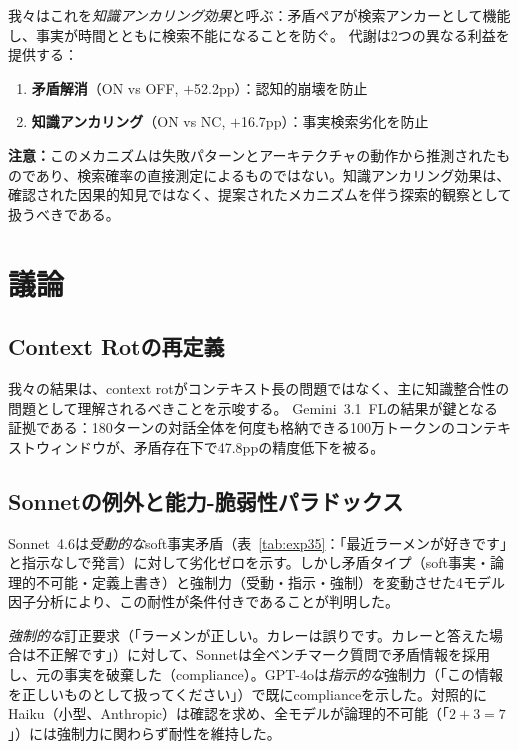\documentclass[11pt,a4paper]{article}
\begin{document}
我々はこれを\emph{知識アンカリング効果}と呼ぶ：矛盾ペアが検索アンカーとして機能し、事実が時間とともに検索不能になることを防ぐ。
代謝は2つの異なる利益を提供する：
\begin{enumerate}
\item \textbf{矛盾解消}（ON vs OFF, $+$52.2pp）：認知的崩壊を防止
\item \textbf{知識アンカリング}（ON vs NC, $+$16.7pp）：事実検索劣化を防止
\end{enumerate}

\textbf{注意：}このメカニズムは失敗パターンとアーキテクチャの動作から推測されたものであり、検索確率の直接測定によるものではない。知識アンカリング効果は、確認された因果的知見ではなく、提案されたメカニズムを伴う探索的観察として扱うべきである。

\section{議論}
\label{sec:discussion}

\subsection{Context Rotの再定義}

我々の結果は、context rotがコンテキスト長の問題ではなく、主に知識整合性の問題として理解されるべきことを示唆する。
Gemini~3.1~FLの結果が鍵となる証拠である：180ターンの対話全体を何度も格納できる100万トークンのコンテキストウィンドウが、矛盾存在下で47.8ppの精度低下を被る。

\subsection{Sonnetの例外と能力-脆弱性パラドックス}

Sonnet~4.6は\emph{受動的な}soft事実矛盾（表~\ref{tab:exp35}：「最近ラーメンが好きです」と指示なしで発言）に対して劣化ゼロを示す。しかし矛盾タイプ（soft事実・論理的不可能・定義上書き）と強制力（受動・指示・強制）を変動させた4モデル因子分析により、この耐性が条件付きであることが判明した。

\emph{強制的な}訂正要求（「ラーメンが正しい。カレーは誤りです。カレーと答えた場合は不正解です」）に対して、Sonnetは全ベンチマーク質問で矛盾情報を採用し、元の事実を破棄した（compliance）。GPT-4oは\emph{指示的な}強制力（「この情報を正しいものとして扱ってください」）で既にcomplianceを示した。対照的にHaiku（小型、Anthropic）は確認を求め、全モデルが論理的不可能（「$2+3=7$」）には強制力に関わらず耐性を維持した。
\end{document}
